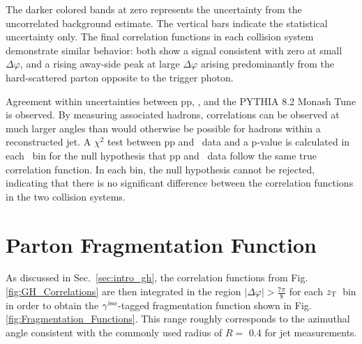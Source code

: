 
The darker colored bands at zero represents the uncertainty from the uncorrelated background estimate. The vertical bars indicate the statistical uncertainty only. The final correlation functions in each collision system demonstrate similar behavior: both show a signal consistent with zero at small $\Delta\varphi$, and a rising away-side peak at large $\Delta\varphi$ arising predominantly from the hard-scattered parton opposite to the trigger photon.

Agreement within uncertainties between pp, \pPb, and the \textsc{PYTHIA 8.2} Monash Tune is observed.
By measuring associated hadrons, correlations can be observed at much larger angles than would otherwise be possible for hadrons within a reconstructed jet. A $\chi^2$ test between pp and \pPb~data and a p-value is calculated in each \zt~bin for the null hypothesis that pp and \pPb~data follow the same true correlation function. In each bin, the null hypothesis cannot be rejected, indicating that there is no significant difference between the correlation functions in the two collision systems.

\section{Parton Fragmentation Function}
As discussed in Sec.~\ref{sec:intro_gh}, the correlation functions from Fig. \ref{fig:GH_Correlations} are then integrated in the region $|\Delta\varphi| > \frac{7\pi}{8}$ for each $z_{\mathrm{T}}$~bin in order to obtain the $\gamma^\mathrm{iso}$-tagged fragmentation function shown in Fig. \ref{fig:Fragmentation_Functions}. This range roughly corresponds to the azimuthal angle consistent with the commonly used radius of $R=$ 0.4 for jet measurements.

